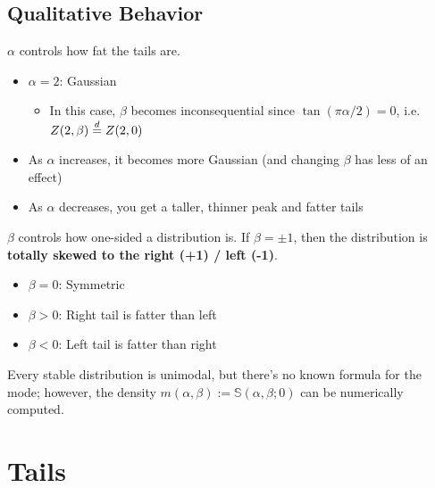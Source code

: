 \documentclass[twoside,10pt]{report}
\begin{document}

\subsection{Qualitative Behavior}

$\alpha$ controls how fat the tails are.
\begin{itemize}
	\item $\alpha = 2$: Gaussian
		\begin{itemize}
			\item In this case, $\beta$ becomes inconsequential since $\tan(\pi \alpha/2) = 0$, i.e. $Z(2,\beta) \stackrel{d}{=} Z(2,0)$
		\end{itemize}
	\item As $\alpha$ increases, it becomes more Gaussian (and changing $\beta$ has less of an effect)
	\item As $\alpha$ decreases, you get a taller, thinner peak and fatter tails
\end{itemize}
$\beta$ controls how one-sided a distribution is. If $\beta = \pm 1$, then the distribution is \textbf{totally skewed to the right (+1) / left (-1)}.
\begin{itemize}
	\item $\beta=0$: Symmetric
	\item $\beta > 0$: Right tail is fatter than left
	\item $\beta < 0$: Left tail is fatter than right
\end{itemize}


Every stable distribution is unimodal, but there's no known formula for the mode; however, the density $m(\alpha,\beta) := \mathbb{S}(\alpha,\beta;0)$ can be numerically computed.


\section{Tails}


\end{document}
